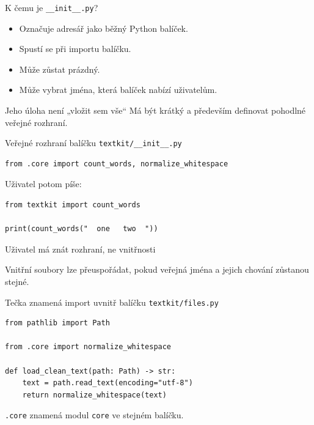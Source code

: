 \documentclass[aspectratio=169]{beamer}
\begin{document}
\begin{frame}{K čemu je \texttt{\_\_init\_\_.py}?}
  \begin{itemize}
    \item Označuje adresář jako běžný Python balíček.
    \item Spustí se při importu balíčku.
    \item Může zůstat prázdný.
    \item Může vybrat jména, která balíček nabízí uživatelům.
  \end{itemize}
  \begin{block}{Jeho úloha není „vložit sem vše“}
    Má být krátký a především definovat pohodlné veřejné rozhraní.
  \end{block}
\end{frame}

\begin{frame}[fragile]{Veřejné rozhraní balíčku}
  \texttt{textkit/\_\_init\_\_.py}
\begin{lstlisting}[style=python]
from .core import count_words, normalize_whitespace
\end{lstlisting}
  Uživatel potom píše:
\begin{lstlisting}[style=python]
from textkit import count_words

print(count_words("  one   two  "))
\end{lstlisting}
\end{frame}

\begin{frame}{Uživatel má znát rozhraní, ne vnitřnosti}
  \centering
  \vspace{6mm}

  Vnitřní soubory lze přeuspořádat, pokud veřejná jména a jejich chování zůstanou stejné.
\end{frame}

\begin{frame}[fragile]{Tečka znamená import uvnitř balíčku}
  \texttt{textkit/files.py}
\begin{lstlisting}[style=python]
from pathlib import Path

from .core import normalize_whitespace

def load_clean_text(path: Path) -> str:
    text = path.read_text(encoding="utf-8")
    return normalize_whitespace(text)
\end{lstlisting}
  \texttt{.core} znamená modul \texttt{core} ve stejném balíčku.
\end{frame}
\end{document}
